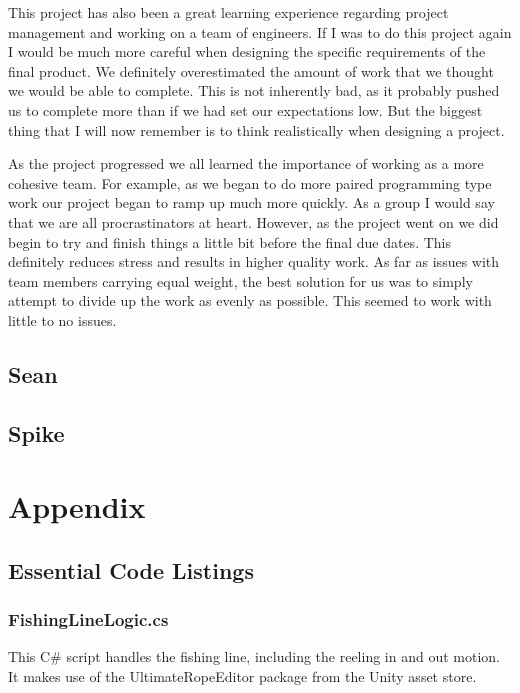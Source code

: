 \documentclass[10pt,journal,compsoc,onecolumn, draftclsnofoot]{IEEEtran}
\begin{document}
This project has also been a great learning experience regarding project management and working on a team of engineers. If I was to do this project again I would be much more careful when designing the specific requirements of the final product. We definitely overestimated the amount of work that we thought we would be able to complete. This is not inherently bad, as it probably pushed us to complete more than if we had set our expectations low. But the biggest thing that I will now remember is to think realistically when designing a project.

As the project progressed we all learned the importance of working as a more cohesive team. For example, as we began to do more paired programming type work our project began to ramp up much more quickly. As a group I would say that we are all procrastinators at heart. However, as the project went on we did begin to try and finish things a little bit before the final due dates. This definitely reduces stress and results in higher quality work. As far as issues with team members carrying equal weight, the best solution for us was to simply attempt to divide up the work as evenly as possible. This seemed to work with little to no issues.

\subsection{Sean}

\subsection{Spike}

\clearpage
\section{Appendix}
\subsection{Essential Code Listings}
\subsubsection{FishingLineLogic.cs}
This C\# script handles the fishing line, including the reeling in and out motion. It makes use of the UltimateRopeEditor package from the Unity asset store. \\
\end{document}
